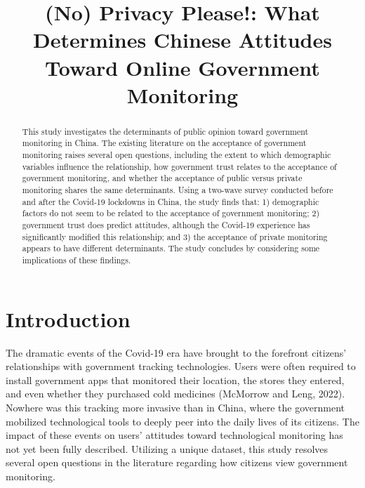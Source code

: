 \documentclass[
  letterpaper,
  DIV=11,
  numbers=noendperiod]{scrartcl}
\title{(No) Privacy Please!: What Determines Chinese Attitudes Toward
Online Government Monitoring}
\author{}
\date{}
\begin{document}
\maketitle
\begin{abstract}
This study investigates the determinants of public opinion toward
government monitoring in China. The existing literature on the
acceptance of government monitoring raises several open questions,
including the extent to which demographic variables influence the
relationship, how government trust relates to the acceptance of
government monitoring, and whether the acceptance of public versus
private monitoring shares the same determinants. Using a two-wave survey
conducted before and after the Covid-19 lockdowns in China, the study
finds that: 1) demographic factors do not seem to be related to the
acceptance of government monitoring; 2) government trust does predict
attitudes, although the Covid-19 experience has significantly modified
this relationship; and 3) the acceptance of private monitoring appears
to have different determinants. The study concludes by considering some
implications of these findings.
\end{abstract}

\section{Introduction}\label{sec-introduction}

The dramatic events of the Covid-19 era have brought to the forefront
citizens' relationships with government tracking technologies. Users
were often required to install government apps that monitored their
location, the stores they entered, and even whether they purchased cold
medicines (McMorrow and Leng, 2022). Nowhere was this tracking more
invasive than in China, where the government mobilized technological
tools to deeply peer into the daily lives of its citizens. The impact of
these events on users' attitudes toward technological monitoring has not
yet been fully described. Utilizing a unique dataset, this study
resolves several open questions in the literature regarding how citizens
view government monitoring.
\end{document}
